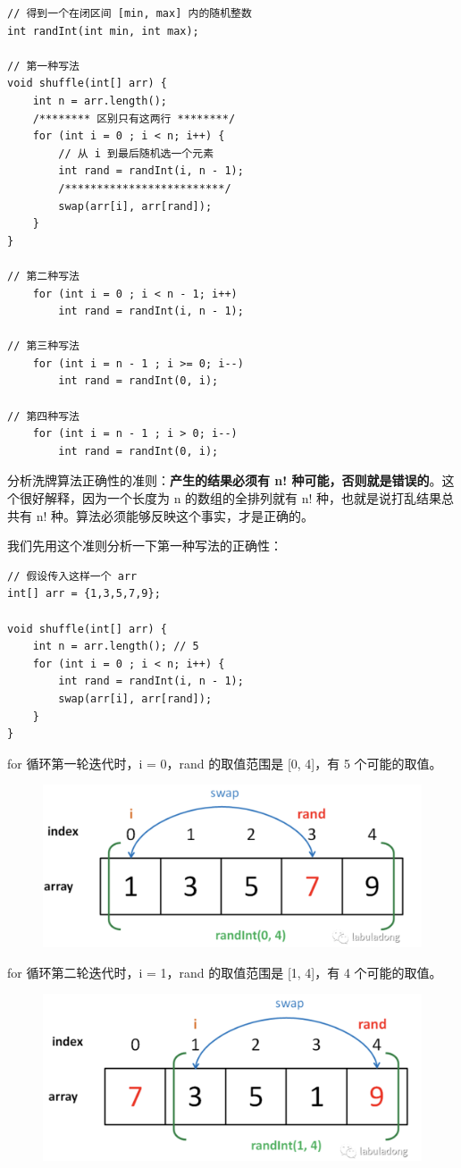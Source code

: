 \documentclass[12pt]{article}
\begin{document}
\begin{lstlisting}
// 得到一个在闭区间 [min, max] 内的随机整数
int randInt(int min, int max);

// 第一种写法
void shuffle(int[] arr) {
    int n = arr.length();
    /******** 区别只有这两行 ********/
    for (int i = 0 ; i < n; i++) {
        // 从 i 到最后随机选一个元素
        int rand = randInt(i, n - 1);
        /*************************/
        swap(arr[i], arr[rand]);
    }
}

// 第二种写法
    for (int i = 0 ; i < n - 1; i++)
        int rand = randInt(i, n - 1);

// 第三种写法
    for (int i = n - 1 ; i >= 0; i--)
        int rand = randInt(0, i);

// 第四种写法
    for (int i = n - 1 ; i > 0; i--)
        int rand = randInt(0, i);
\end{lstlisting}

分析洗牌算法正确性的准则：\textbf{产生的结果必须有 n! 种可能，否则就是错误的}。这个很好解释，因为一个长度为 n 的数组的全排列就有 n! 种，也就是说打乱结果总共有 n! 种。算法必须能够反映这个事实，才是正确的。

我们先用这个准则分析一下第一种写法的正确性：
\begin{lstlisting}
// 假设传入这样一个 arr
int[] arr = {1,3,5,7,9};

void shuffle(int[] arr) {
    int n = arr.length(); // 5
    for (int i = 0 ; i < n; i++) {
        int rand = randInt(i, n - 1);
        swap(arr[i], arr[rand]);
    }
}
\end{lstlisting}

for 循环第一轮迭代时，i = 0，rand 的取值范围是 [0, 4]，有 5 个可能的取值。
\begin{figure}[H]
    \centering
    \includegraphics[width=.6\textwidth]{fig/shuffle_algorithm_1.png}
\end{figure}

for 循环第二轮迭代时，i = 1，rand 的取值范围是 [1, 4]，有 4 个可能的取值。
\begin{figure}[H]
    \centering
    \includegraphics[width=.6\textwidth]{fig/shuffle_algorithm_2.png}
\end{figure}
\end{document}
